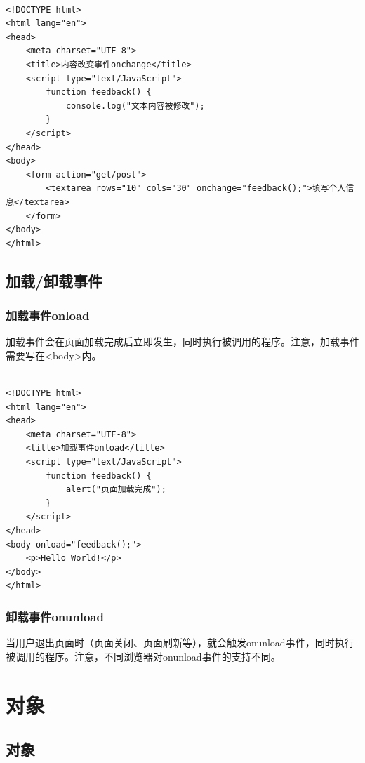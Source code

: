  \\

\begin{lstlisting}[style=htmlcssjs]
<!DOCTYPE html>
<html lang="en">
<head>
    <meta charset="UTF-8">
    <title>内容改变事件onchange</title>
    <script type="text/JavaScript">
        function feedback() {
            console.log("文本内容被修改");
        }
    </script>
</head>
<body>
    <form action="get/post">
        <textarea rows="10" cols="30" onchange="feedback();">填写个人信息</textarea>
    </form>
</body>
</html>
\end{lstlisting}

\newpage

\section{加载/卸载事件}

\subsection{加载事件onload}

加载事件会在页面加载完成后立即发生，同时执行被调用的程序。注意，加载事件需要写在<body>内。 \\

 \\

\begin{lstlisting}[style=htmlcssjs]
<!DOCTYPE html>
<html lang="en">
<head>
    <meta charset="UTF-8">
    <title>加载事件onload</title>
    <script type="text/JavaScript">
        function feedback() {
            alert("页面加载完成");
        }
    </script>
</head>
<body onload="feedback();">
    <p>Hello World!</p>
</body>
</html>
\end{lstlisting}

\subsection{卸载事件onunload}

当用户退出页面时（页面关闭、页面刷新等），就会触发onunload事件，同时执行被调用的程序。注意，不同浏览器对onunload事件的支持不同。

\newpage

\chapter{对象}

\section{对象}

